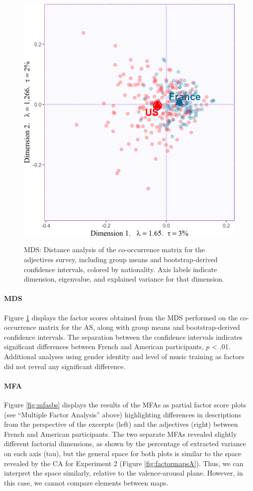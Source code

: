 \documentclass[
  english,
  man]{apa6}
\let\oldparagraph\paragraph
\renewcommand{\paragraph}[1]{\oldparagraph{#1}\mbox{}}
\begin{document}
\begin{figure}   
  \centering  
  \caption{MDS: Distance analysis of the co-occurrence matrix for the adjectives survey, including group means and bootstrap-derived confidence intervals, colored by nationality. Axis labels indicate dimension, eigenvalue, and explained variance for that dimension.}
    \includegraphics[width=0.7\columnwidth]{./Music-Descriptor-Space_files/figure-latex/map4RVAcode-1.png}
  \label{fig:map4RVA}
\end{figure}

\hypertarget{mds}{%
\paragraph{MDS}\label{mds}}

Figure \ref{fig:map4RVA} displays the factor scores obtained from the MDS performed on the co-occurrence matrix for the AS, along with group means and bootstrap-derived confidence intervals. The separation between the confidence intervals indicates significant differences between French and American participants, \(\textit{p}\) \textless{} .01. Additional analyses using gender identity and level of music training as factors did not reveal any significant difference.

\hypertarget{mfa}{%
\paragraph{MFA}\label{mfa}}

Figure \ref{fig:mfasbs} displays the results of the MFAs as partial factor score plots (see ``Multiple Factor Analysis'' above) highlighting differences in descriptions from the perspective of the excerpts (left) and the adjectives (right) between French and American participants. The two separate MFAs revealed slightly different factorial dimensions, as shown by the percentage of extracted variance on each axis (tau), but the general space for both plots is similar to the space revealed by the CA for Experiment 2 (Figure \ref{fig:factormapsA}). Thus, we can interpret the space similarly, relative to the valence-arousal plane. However, in this case, we cannot compare elements between maps.
\end{document}
